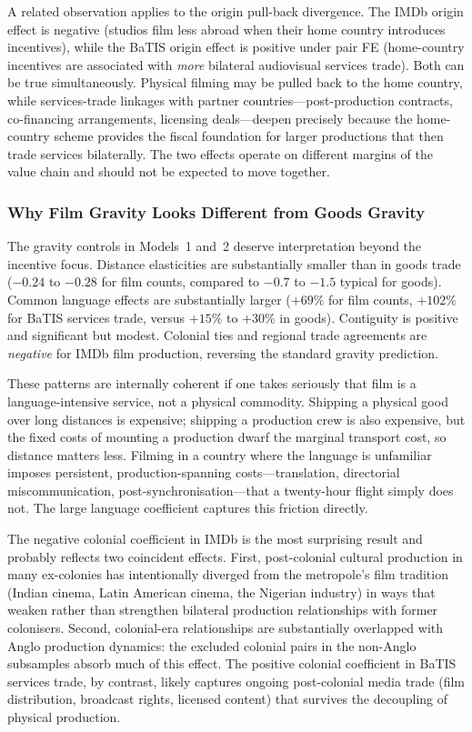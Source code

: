 A related observation applies to the origin pull-back divergence. The IMDb origin effect is negative (studios film less abroad when their home country introduces incentives), while the BaTIS origin effect is positive under pair FE (home-country incentives are associated with \textit{more} bilateral audiovisual services trade). Both can be true simultaneously. Physical filming may be pulled back to the home country, while services-trade linkages with partner countries---post-production contracts, co-financing arrangements, licensing deals---deepen precisely because the home-country scheme provides the fiscal foundation for larger productions that then trade services bilaterally. The two effects operate on different margins of the value chain and should not be expected to move together.

\subsubsection{Why Film Gravity Looks Different from Goods Gravity}

The gravity controls in Models~1 and~2 deserve interpretation beyond the incentive focus. Distance elasticities are substantially smaller than in goods trade ($-0.24$ to $-0.28$ for film counts, compared to $-0.7$ to $-1.5$ typical for goods). Common language effects are substantially larger ($+69\%$ for film counts, $+102\%$ for BaTIS services trade, versus $+15\%$ to $+30\%$ in goods). Contiguity is positive and significant but modest. Colonial ties and regional trade agreements are \textit{negative} for IMDb film production, reversing the standard gravity prediction.

These patterns are internally coherent if one takes seriously that film is a language-intensive service, not a physical commodity. Shipping a physical good over long distances is expensive; shipping a production crew is also expensive, but the fixed costs of mounting a production dwarf the marginal transport cost, so distance matters less. Filming in a country where the language is unfamiliar imposes persistent, production-spanning costs---translation, directorial miscommunication, post-synchronisation---that a twenty-hour flight simply does not. The large language coefficient captures this friction directly.

The negative colonial coefficient in IMDb is the most surprising result and probably reflects two coincident effects. First, post-colonial cultural production in many ex-colonies has intentionally diverged from the metropole's film tradition (Indian cinema, Latin American cinema, the Nigerian industry) in ways that weaken rather than strengthen bilateral production relationships with former colonisers. Second, colonial-era relationships are substantially overlapped with Anglo production dynamics: the excluded colonial pairs in the non-Anglo subsamples absorb much of this effect. The positive colonial coefficient in BaTIS services trade, by contrast, likely captures ongoing post-colonial media trade (film distribution, broadcast rights, licensed content) that survives the decoupling of physical production.


